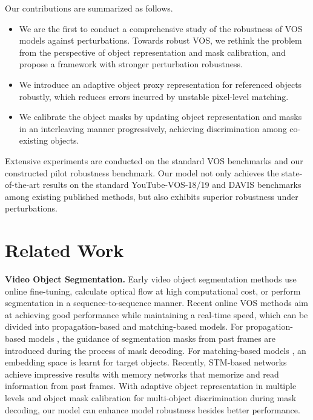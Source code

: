 \documentclass[sigconf]{acmart}
\begin{document}
Our contributions are summarized as follows. 
\begin{itemize}
    \item We are the first to conduct a comprehensive study of the robustness of VOS models against perturbations. Towards robust VOS, we rethink the problem from the perspective of object representation and mask calibration, and propose a framework with stronger perturbation robustness. 
    \item We introduce an adaptive object proxy representation for referenced objects robustly, which reduces errors incurred by unstable pixel-level matching. 
    \item We calibrate the object masks by updating object representation and masks in an interleaving manner progressively, achieving discrimination among co-existing objects. 
\end{itemize}

Extensive experiments are conducted on the standard VOS benchmarks and our constructed pilot robustness benchmark.
Our model not only achieves the state-of-the-art results on the standard YouTube-VOS-18/19 and DAVIS benchmarks among existing published methods, but also exhibits superior robustness under perturbations.

 \section{Related Work}
\noindent\textbf{Video Object Segmentation.}
Early video object segmentation methods \cite{perazzi2017learning,caelles2017one,khoreva2019lucid,cheng2017segflow,xu2018dynamic,zhang2012video} use online fine-tuning, calculate optical flow at high computational cost, or perform segmentation in a sequence-to-sequence manner.
Recent online VOS methods \cite{10.1145/3394171.3414035} aim at achieving good performance while maintaining a real-time speed, which can be divided into propagation-based and matching-based models. For propagation-based models \cite{perazzi2017learning,caelles2017one,khoreva2019lucid}, the guidance of segmentation masks from past frames are introduced during the process of mask decoding. For matching-based models \cite{chen2018blazingly,hu2018videomatch,zeng2019dmm,yang2020collaborative,lin2019agss,voigtlaender2019feelvos,wang2019ranet,liang2020waternet,hu2018videomatch,duke2021sstvos,mao2021joint,yang2021collaborative,9710441}, an embedding space is learnt for target objects. Recently, STM-based networks \cite{oh2019video,seong2020kernelized,lu2020video,cheng2021modular,wang2021swiftnet,xie2021efficient,hu2021learning,liang2020video,seong2021hierarchical} achieve impressive results with memory networks that memorize and read information from past frames. With adaptive object representation in multiple levels and object mask calibration for multi-object discrimination during mask decoding, our model can enhance model robustness besides better performance.
\end{document}
